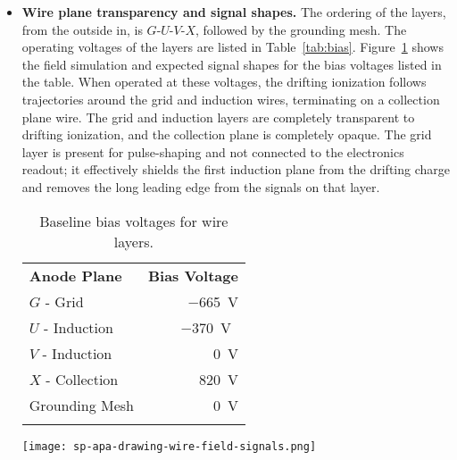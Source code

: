 \begin{itemize}
\item \textbf{Wire plane transparency and signal shapes.}  The ordering of the layers, from the outside in, is $G$-$U$-$V$-$X$, followed by the grounding mesh. The operating voltages of the  layers are listed in Table~\ref{tab:bias}.  Figure~\ref{fig:apa-fields} shows the field simulation and expected signal shapes for the bias voltages listed in the table.  When operated at these voltages, the drifting ionization follows trajectories around the grid and induction wires, terminating on a collection plane wire. The grid and induction layers are completely transparent to drifting ionization, and the collection plane is completely opaque.  The grid layer is present for pulse-shaping and not connected to the electronics readout; it effectively shields the first induction plane from the drifting charge and removes the long leading edge from the signals on that layer. 


\begin{table}[ht]
\begin{minipage}[b]{0.46\linewidth}
\centering
\begin{tabular}{ l  r }
    \hline
    \textbf{Anode Plane} & \textbf{Bias Voltage} \\ \toprowrule
	$G$ - Grid & \SI{-665}{V} \\ \colhline
	$U$ - Induction & \SI{-370}{V{}} \\ \colhline
	$V$ - Induction & \SI{0}{V} \\ \colhline
	$X$ - Collection & \SI{820}{V} \\ \colhline
	Grounding Mesh & \SI{0}{V} \\ \colhline
    \end{tabular}
    \caption{Baseline bias voltages for  wire layers.}
    \label{tab:bias}
\end{minipage}\hfill
\begin{minipage}[t]{0.5\linewidth}
\centering
\texttt{[image: sp-apa-drawing-wire-field-signals.png]}
\label{fig:apa-fields}
\end{minipage}
\end{table}


\end{itemize}
